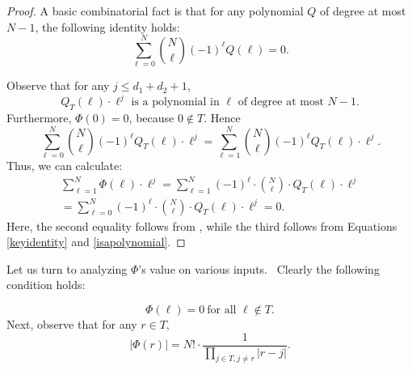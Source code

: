 \documentclass[10pt,a4paper]{article}
\newcommand{\<}{\langle}
\renewcommand{\>}{\rangle}
\begin{document}
\begin{proof}
A basic combinatorial fact is that for any polynomial $Q$ of degree at most $N-1$,
the following identity holds:
\begin{equation} 
\label{keyidentity} 
\sum_{\ell=0}^N \binom{N}{\ell} (-1)^\ell Q(\ell) = 0.
\end{equation}

Observe that for any $j \leq d_1 + d_2+1$,
\begin{equation} \label{isapolynomial}  
Q_T(\ell) \cdot \ell^j  \text{ is a polynomial in } \ell \text{ of degree at most } N-1. 
\end{equation}
Furthermore, $\Phi(0)=0$, because $0 \not\in T$. Hence
\begin{equation} \label{nozeroterm} 
\sum_{\ell=0}^N \binom{N}{\ell} (-1)^\ell Q_T(\ell) \cdot \ell^j= \sum_{\ell=1}^N \binom{N}{\ell} (-1)^\ell Q_T(\ell) \cdot \ell^j. 
\end{equation}
Thus, we can calculate:
\begin{eqnarray*}
\sum_{\ell=1}^N \Phi(\ell) \cdot \ell^{j} = \sum_{\ell=1}^N (-1)^{\ell} \cdot \binom{N}{\ell} \cdot Q_T(\ell) \cdot \ell^j\\
= \sum_{\ell=0}^N (-1)^\ell \cdot \binom{N}{\ell} \cdot Q_T(\ell) \cdot \ell^j
=0.
\end{eqnarray*}
Here, the second equality follows from , while the third follows
from Equations \eqref{keyidentity} and \eqref{isapolynomial}.
\end{proof}

Let us turn to analyzing $\Phi $'s value on various inputs. \ Clearly the
following condition holds:

\begin{equation}
\Phi (\ell )=0~\text{for all }\ell \not\in T\text{.}  \label{zeros}
\end{equation}
Next, observe that for any $r\in T$,
\begin{equation*}
\left\vert \Phi (r)\right\vert =N!\cdot \frac{1}{\prod_{j\in T,j\neq r}|r-j|}
.
\end{equation*}
\end{document}
